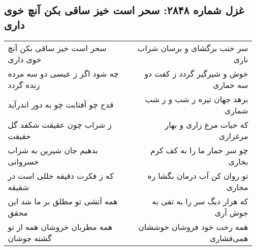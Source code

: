 \begin{center}
\section*{غزل شماره ۲۸۴۸: سحر است خیز ساقی بکن آنچ خوی داری}
\label{sec:2848}
\begin{longtable}{l p{0.5cm} r}
سحر است خیز ساقی بکن آنچ خوی داری
&&
سر خنب برگشای و برسان شراب ناری
\\
چه شود اگر ز عیسی دو سه مرده زنده گردد
&&
خوش و شیرگیر گردد ز کفت دو سه خماری
\\
قدح چو آفتابت چو به دور اندرآید
&&
برهد جهان تیره ز شب و ز شب شماری
\\
ز شراب چون عقیقت شکفد گل حقیقت
&&
که حیات مرغ زاری و بهار مرغزاری
\\
بدهیم جان شیرین به شراب خسروانی
&&
چو سر خمار ما را به کف کرم بخاری
\\
که ز فکرت دقیقه خللی است در شقیقه
&&
تو روان کن آب درمان بگشا ره مجاری
\\
همه آتشی تو مطلق بر ما شد این محقق
&&
که هزار دیگ سر را به تفی به جوش آری
\\
همه مطربان خروشان همه از تو گشته جوشان
&&
همه رخت خود فروشان خوششان همی‌فشاری
\\
\end{longtable}
\end{center}
